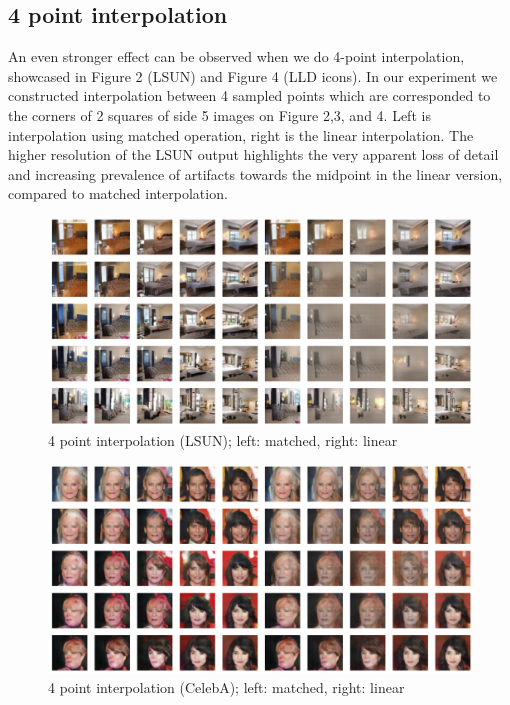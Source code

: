 \documentclass{article}
\begin{document}
\subsection{4 point interpolation}
An even stronger effect can be observed when we do 4-point interpolation,
showcased in Figure 2 (LSUN) and Figure 4 (LLD icons). In our experiment we constructed interpolation between 4 sampled points which are corresponded to the corners of 2 squares of side 5 images on Figure 2,3, and 4. Left is interpolation using matched operation, right is the linear interpolation.  The higher resolution of the LSUN output highlights the very apparent loss of detail and increasing prevalence of artifacts towards the midpoint in the linear version, compared to matched interpolation. 



\begin{center}
\begin{figure}
    \includegraphics[width=0.95\linewidth]{CelebA/images/LSUN_int4_1.png}
    \caption{4 point interpolation (LSUN); left: matched, right: linear}
\end{figure}
\end{center}

\begin{center}
\begin{figure}
    \includegraphics[width=0.95\linewidth]{CelebA/images/CelebA_int4_2.png}
    \caption{4 point interpolation (CelebA); left: matched, right: linear}
\end{figure}
\end{center}
\end{document}
